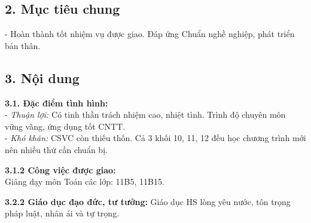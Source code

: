 \documentclass[12pt,a4paper]{article}
\begin{document}
\subsection*{2. Mục tiêu chung}
- Hoàn thành tốt nhiệm vụ được giao. Đáp ứng Chuẩn nghề nghiệp, phát triển bản thân.

\subsection*{3. Nội dung}
\textbf{3.1. Đặc điểm tình hình:}\\
- \textit{Thuận lợi:} Có tinh thần trách nhiệm cao, nhiệt tình. Trình độ chuyên môn vững vàng, ứng dụng tốt CNTT.\\
- \textit{Khó khăn:} CSVC còn thiếu thốn. Cả 3 khối 10, 11, 12 đều học chương trình mới nên nhiều thứ cần chuẩn bị.

\textbf{3.1.2 Công việc được giao:}\\
Giảng dạy môn Toán các lớp: 11B5, 11B15.

\textbf{3.2.2 Giáo dục đạo đức, tư tưởng:} Giáo dục HS lòng yêu nước, tôn trọng pháp luật, nhân ái và tự trọng.

\newpage
\end{document}
